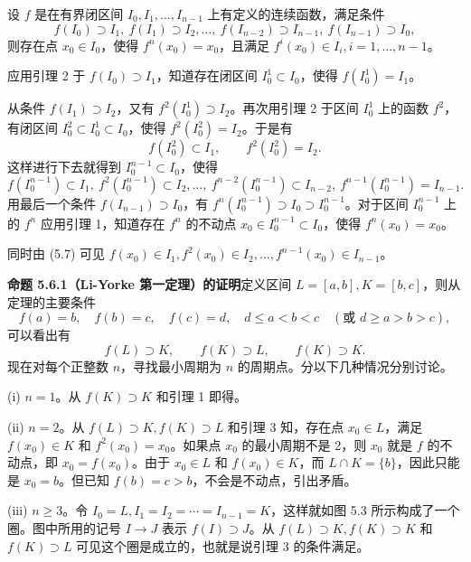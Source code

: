 \begin{xexample}[5.6.3（引理 3）]
设 $f$ 是在有界闭区间 $I_0,I_1,\ldots,I_{n-1}$ 上有定义的连续函数，满足条件
\[
  f(I_0)\supset I_1,\ f(I_1)\supset I_2,\ldots,\ f(I_{n-2})\supset I_{n-1},\ f(I_{n-1})\supset I_0,
\]
则存在点 $x_0\in I_0$，使得 $f^n(x_0)=x_0$，且满足 $f^i(x_0)\in I_i,i=1,\ldots,n-1$。
\end{xexample}
\begin{xproof}
应用引理 2 于 $f(I_0)\supset I_1$，知道存在闭区间 $I_0^1\subset I_0$，使得 $f(I_0^1)=I_1$。

从条件 $f(I_1)\supset I_2$，又有 $f^2(I_0^1)\supset I_2$。再次用引理 2 于区间 $I_0^1$ 上的函数 $f^2$，有闭区间 $I_0^2\subset I_0^1\subset I_0$，使得 $f^2(I_0^2)=I_2$。于是有
\[
  f(I_0^2)\subset I_1,\qquad f^2(I_0^2)=I_2.
\]
这样进行下去就得到 $I_0^{n-1}\subset I_0$，使得
\begin{equation}
  f(I_0^{n-1})\subset I_1,\ f^2(I_0^{n-1})\subset I_2,\ldots,\ f^{n-2}(I_0^{n-1})\subset I_{n-2},\ f^{n-1}(I_0^{n-1})=I_{n-1}.
  \tag{5.7}
  \label{eq:5.7}
\end{equation}
用最后一个条件 $f(I_{n-1})\supset I_0$，有 $f^n(I_0^{n-1})\supset I_0\supset I_0^{n-1}$。对于区间 $I_0^{n-1}$ 上的 $f^n$ 应用引理 1，知道存在 $f^n$ 的不动点 $x_0\in I_0^{n-1}\subset I_0$，使得 $f^n(x_0)=x_0$。

同时由 (5.7) 可见 $f(x_0)\in I_1,f^2(x_0)\in I_2,\ldots,f^{n-1}(x_0)\in I_{n-1}$。
\end{xproof}

\begin{xproof}
\textbf{命题 5.6.1（Li-Yorke 第一定理）的证明}\quad 定义区间 $L=[a,b],K=[b,c]$，则从定理的主要条件
\[
  f(a)=b,\quad f(b)=c,\quad f(c)=d,\quad d\le a<b<c\quad(\text{或 }d\ge a>b>c),
\]
可以看出有
\[
  f(L)\supset K,\qquad f(K)\supset L,\qquad f(K)\supset K.
\]
现在对每个正整数 $n$，寻找最小周期为 $n$ 的周期点。分以下几种情况分别讨论。

(i) $n=1$。从 $f(K)\supset K$ 和引理 1 即得。

(ii) $n=2$。从 $f(L)\supset K,f(K)\supset L$ 和引理 3 知，存在点 $x_0\in L$，满足 $f(x_0)\in K$ 和 $f^2(x_0)=x_0$。如果点 $x_0$ 的最小周期不是 2，则 $x_0$ 就是 $f$ 的不动点，即 $x_0=f(x_0)$。由于 $x_0\in L$ 和 $f(x_0)\in K$，而 $L\cap K=\{b\}$，因此只能是 $x_0=b$。但已知 $f(b)=c>b$，不会是不动点，引出矛盾。

(iii) $n\ge3$。令 $I_0=L,I_1=I_2=\cdots=I_{n-1}=K$，这样就如图 5.3 所示构成了一个圈。图中所用的记号 $I\longrightarrow J$ 表示 $f(I)\supset J$。从 $f(L)\supset K,f(K)\supset K$ 和 $f(K)\supset L$ 可见这个圈是成立的，也就是说引理 3 的条件满足。
\end{xproof}

